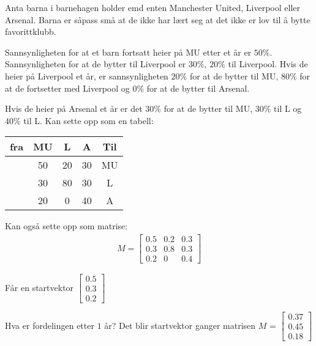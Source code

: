 \documentclass[11pt, a4paper, norsk]{article}
\begin{document}
        \begin{Example}{}{}
            Anta barna i barnehagen holder emd enten Manchester United, Liverpool eller Arsenal. Barna er såpass små at de ikke har lært seg at det ikke er lov til å bytte favorittklubb. 

            Sannsynligheten for at et barn fortsatt heier på MU etter et år er $50\%$. Sannsynligheten for at de bytter til Liverpool er $30\%$, $20\%$ til Liverpool.
            Hvis de heier på Liverpool et år, er sannsynligheten $20\%$ for at de bytter til MU, $80\%$ for at de fortsetter med Liverpool og $0\%$ for at de bytter til Arsenal.

            Hvis de heier på Arsenal et år er det $30\%$ for at de bytter til MU, $30\%$ til L og $40\%$ til L. Kan sette opp som en tabell:

            \begin{tabular}{c|c|c|c|c}
                \hline
                fra  & MU & L & A & Til 
                \\
                \hline
                     & 50 & 20 & 30 & MU \\
                     \hline
                     & 30 & 80 & 30 & L \\
                     \hline
                     & 20 & 0 & 40 & A
            \end{tabular}

            Kan også sette opp som matrise:
            \begin{align*}
                M = \begin{bmatrix}
                    0.5 & 0.2 & 0.3 \\
                    0.3 & 0.8 & 0.3 \\
                    0.2 & 0 & 0.4
                \end{bmatrix}
            \end{align*}
                    
            Får en startvektor $\begin{bmatrix}
                0.5 \\
                0.3 \\
                0.2
            \end{bmatrix}$

            
            Hva er fordelingen etter $1$ år? Det blir startvektor ganger matrisen $M$ = $\begin{bmatrix}
                0.37 \\
                0.45 \\
                0.18
            \end{bmatrix}$



\end{Example}
\end{document}
